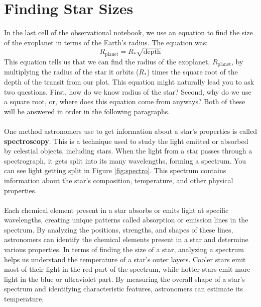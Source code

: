 \documentclass[14pt]{article}
\begin{document}
\section{Finding Star Sizes}
\label{a:starsize}

\noindent In the last cell of the observational notebook, we use an equation to find the size of the exoplanet in terms of the Earth's radius. The equation was:
\begin{equation}
    R_{\text{planet}} = R_{*} \sqrt{\text{depth}}
\end{equation}
This equation tells us that we can find the radius of the exoplanet, $R_{\text{planet}}$, by multiplying the radius of the star it orbits ($R_*$) times the square root of the depth of the transit from our plot. This equation might naturally lead you to ask two questions. First, how do we know radius of the star? Second, why do we use a square root, or, where does this equation come from anyways? Both of these will be answered in order in the following paragraphs.
\\\\
\noindent One method astronomers use to get information about a star's properties is called \textbf{spectroscopy}. This is a technique used to study the light emitted or absorbed by celestial objects, including stars. When the light from a star passes through a spectrograph, it gets split into its many wavelengths, forming a spectrum. You can see light getting split in Figure \ref{fig:spectro}. This spectrum contains information about the star's composition, temperature, and other physical properties.
\\\\
\noindent Each chemical element present in a star absorbs or emits light at specific wavelengths, creating unique patterns called absorption or emission lines in the spectrum. By analyzing the positions, strengths, and shapes of these lines, astronomers can identify the chemical elements present in a star and determine various properties. In terms of finding the size of a star, analyzing a spectrum helps us understand the temperature of a star's outer layers. Cooler stars emit most of their light in the red part of the spectrum, while hotter stars emit more light in the blue or ultraviolet part. By measuring the overall shape of a star's spectrum and identifying characteristic features, astronomers can estimate its temperature.
\end{document}
